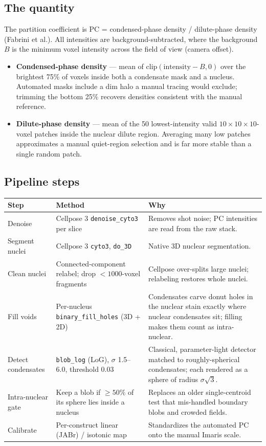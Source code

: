 \documentclass[11pt]{article}
\newcommand{\code}[1]{\texttt{\small #1}}
\begin{document}
\subsection{The quantity}
The partition coefficient is PC = condensed-phase density / dilute-phase density
(Fabrini et al.). All intensities are background-subtracted, where the background $B$
is the minimum voxel intensity across the field of view (camera offset).
\begin{itemize}\setlength{\itemsep}{1pt}
\item \textbf{Condensed-phase density} --- mean of $\mathrm{clip}(\text{intensity}-B,0)$
over the brightest 75\% of voxels inside both a condensate mask and a nucleus. Automated
masks include a dim halo a manual tracing would exclude; trimming the bottom 25\% recovers
densities consistent with the manual reference.
\item \textbf{Dilute-phase density} --- mean of the 50 lowest-intensity valid
$10\times10\times10$-voxel patches inside the nuclear dilute region. Averaging many low
patches approximates a manual quiet-region selection and is far more stable than a single random patch.
\end{itemize}

\subsection{Pipeline steps}
\begin{center}
\begin{tabular}{>{\RaggedRight}p{2.4cm} >{\RaggedRight}p{4.6cm} >{\RaggedRight}p{6cm}}
\toprule
\textbf{Step} & \textbf{Method} & \textbf{Why}\\
\midrule
Denoise & Cellpose 3 \code{denoise\_cyto3} per slice & Removes shot noise; PC intensities are read from the raw stack.\\
Segment nuclei & Cellpose 3 \code{cyto3}, \code{do\_3D} & Native 3D nuclear segmentation.\\
Clean nuclei & Connected-component relabel; drop $<1000$-voxel fragments & Cellpose over-splits large nuclei; relabeling restores whole nuclei.\\
Fill voids & Per-nucleus \code{binary\_fill\_holes} (3D + 2D) & Condensates carve donut holes in the nuclear stain exactly where nuclear condensates sit; filling makes them count as intra-nuclear.\\
Detect condensates & \code{blob\_log} (LoG), $\sigma$ 1.5--6.0, threshold 0.03 & Classical, parameter-light detector matched to roughly-spherical condensates; each rendered as a sphere of radius $\sigma\sqrt{3}$.\\
Intra-nuclear gate & Keep a blob if $\geq 50\%$ of its sphere lies inside a nucleus & Replaces an older single-centroid test that mis-handled boundary blobs and crowded fields.\\
Calibrate & Per-construct linear (JABr) / isotonic map & Standardizes the automated PC onto the manual Imaris scale.\\
\bottomrule
\end{tabular}
\end{center}
\end{document}
